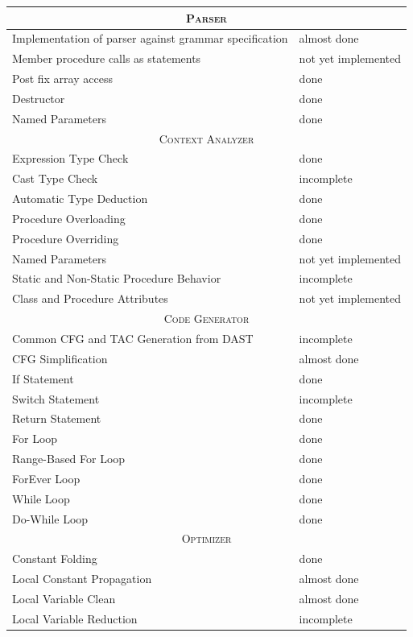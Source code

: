 \documentclass{report}
\def\done{\textcolor{weakGreen}{done}}
\def\almdone{\textcolor{weakYellow}{almost done}}
\def\incompl{\textcolor{weakOrange}{incomplete}}
\def\notimpl{\textcolor{weakRed}{not yet implemented}}
\begin{document}
\begin{center}
\begin{tabular}[ht]{ | p{} | p{} | }
	\hline
	\multicolumn{2}{|c|}{\textsc{Parser}} \\
	\hline
	Implementation of parser against grammar specification & \almdone \\
	\hline
	Member procedure calls as statements & \notimpl \\
	\hline
	Post fix array access & \done \\
	\hline
	Destructor & \done \\
	\hline
	Named Parameters & \done \\
	
	\hline \hline
	\multicolumn{2}{|c|}{\textsc{Context Analyzer}} \\
	\hline
	Expression Type Check & \done \\
	\hline
	Cast Type Check & \incompl \\
	\hline
	Automatic Type Deduction & \done \\
	\hline
	Procedure Overloading & \done \\
	\hline
	Procedure Overriding & \done \\
	\hline
	Named Parameters & \notimpl \\
	\hline
	Static and Non-Static Procedure Behavior & \incompl \\
	\hline
	Class and Procedure Attributes & \notimpl \\
	
	\hline \hline
	\multicolumn{2}{|c|}{\textsc{Code Generator}} \\
	\hline
	Common CFG and TAC Generation from DAST & \incompl \\
	\hline
	CFG Simplification & \almdone \\
	\hline
	If Statement & \done \\
	\hline
	Switch Statement & \incompl \\
	\hline
	Return Statement & \done \\
	\hline
	For Loop & \done \\
	\hline
	Range-Based For Loop & \done \\
	\hline
	ForEver Loop & \done \\
	\hline
	While Loop & \done \\
	\hline
	Do-While Loop & \done \\
	
	\hline \hline
	\multicolumn{2}{|c|}{\textsc{Optimizer}} \\
	\hline
	Constant Folding & \done \\
	\hline
	Local Constant Propagation & \almdone \\
	\hline
	Local Variable Clean & \almdone \\
	\hline
	Local Variable Reduction & \incompl \\
	

\end{tabular}
\end{center}
\end{document}

